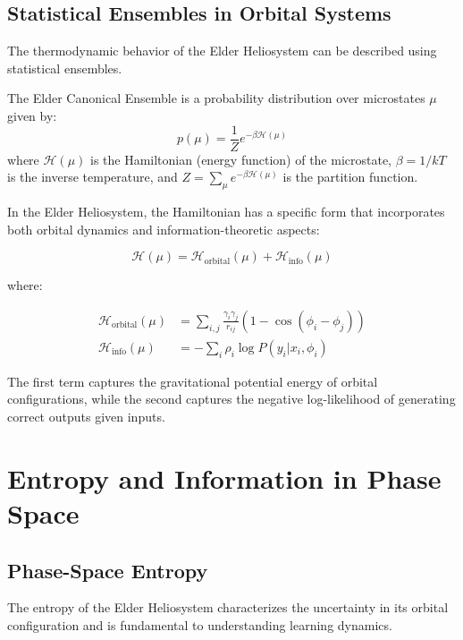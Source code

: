 \subsection{Statistical Ensembles in Orbital Systems}

The thermodynamic behavior of the Elder Heliosystem can be described using statistical ensembles.

\begin{definition}
The Elder Canonical Ensemble is a probability distribution over microstates $\mu$ given by:
\begin{equation}
p(\mu) = \frac{1}{Z} e^{-\beta \mathcal{H}(\mu)}
\end{equation}
where $\mathcal{H}(\mu)$ is the Hamiltonian (energy function) of the microstate, $\beta = 1/kT$ is the inverse temperature, and $Z = \sum_{\mu} e^{-\beta \mathcal{H}(\mu)}$ is the partition function.
\end{definition}

In the Elder Heliosystem, the Hamiltonian has a specific form that incorporates both orbital dynamics and information-theoretic aspects:

\begin{equation}
\mathcal{H}(\mu) = \mathcal{H}_{\text{orbital}}(\mu) + \mathcal{H}_{\text{info}}(\mu)
\end{equation}

where:

\begin{align}
\mathcal{H}_{\text{orbital}}(\mu) &= \sum_{i,j} \frac{\gamma_i \gamma_j}{r_{ij}} (1 - \cos(\phi_i - \phi_j)) \\
\mathcal{H}_{\text{info}}(\mu) &= -\sum_i \rho_i \log P(y_i | x_i, \phi_i)
\end{align}

The first term captures the gravitational potential energy of orbital configurations, while the second captures the negative log-likelihood of generating correct outputs given inputs.

\section{Entropy and Information in Phase Space}

\subsection{Phase-Space Entropy}

The entropy of the Elder Heliosystem characterizes the uncertainty in its orbital configuration and is fundamental to understanding learning dynamics.

